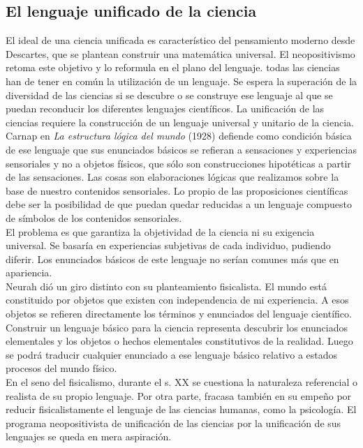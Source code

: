 \documentclass[a4paper, 11pt, twocolumn, spanish]{article}
\begin{document}
\subsection{El lenguaje unificado de la ciencia}
\label{sec:org0080fec}
El ideal de una ciencia unificada es característico del pensamiento
moderno desde Descartes, que se plantean construir una matemática
universal. El neopositivismo retoma este objetivo y lo reformula en el
plano del lenguaje. todas las ciencias han de tener en común la
utilización de un lenguaje. Se espera la superación de la diversidad
de las ciencias si se descubre o se construye ese lenguaje al que se
puedan reconducir los diferentes lenguajes científicos. La unificación
de las ciencias requiere la construcción de un lenguaje universal y
unitario de la ciencia.\\

Carnap en \emph{La estructura lógica del mundo} (1928) defiende como
condición básica de ese lenguaje que sus enunciados básicos se
refieran a sensaciones y experiencias sensoriales y no a objetos
físicos, que sólo son construcciones hipotéticas a partir de las
sensaciones. Las cosas son elaboraciones lógicas que realizamos sobre
la base de nuestro contenidos sensoriales. Lo propio de las
proposiciones científicas debe ser la posibilidad de que puedan quedar
reducidas a un lenguaje compuesto de símbolos de los contenidos
sensoriales.\\

El problema es que garantiza la objetividad de la ciencia ni su
exigencia universal. Se basaría en experiencias subjetivas de cada
individuo, pudiendo diferir. Los enunciados básicos de este lenguaje
no serían comunes más que en apariencia.\\
Neurah dió un giro distinto con su planteamiento fisicalista. El mundo
está constituido por objetos que existen con independencia de mi
experiencia. A esos objetos se refieren directamente los términos y
enunciados del lenguaje científico. Construir un lenguaje básico para
la ciencia representa descubrir los enunciados elementales y los
objetos o hechos elementales constitutivos de la realidad. Luego se
podrá traducir cualquier enunciado a ese lenguaje básico relativo a
estados  procesos del mundo físico.\\

En el seno del fisicalismo, durante el s. XX se cuestiona la
naturaleza referencial o realista de su propio lenguaje. Por otra
parte, fracasa también en su empeño por reducir fisicalistamente el
lenguaje de las ciencias humanas, como la psicología. El programa
neopositivista de unificación de las ciencias por la unificación de
sus lenguajes se queda en mera aspiración.
\end{document}
